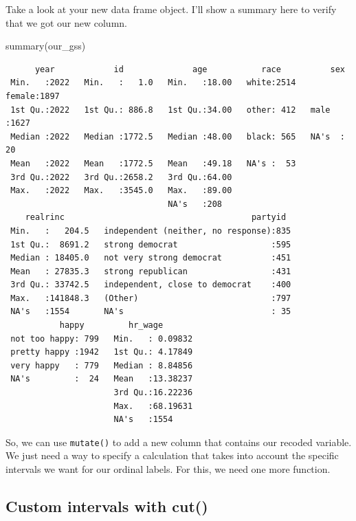 \documentclass[
  letterpaper,
  DIV=11,
  numbers=noendperiod]{scrreprt}
\newenvironment{Shaded}{\begin{snugshade}}{\end{snugshade}}
\newcommand{\FunctionTok}[1]{\textcolor[rgb]{0.28,0.35,0.67}{#1}}
\newcommand{\NormalTok}[1]{\textcolor[rgb]{0.00,0.23,0.31}{#1}}
\begin{document}
Take a look at your new data frame object. I'll show a summary here to
verify that we got our new column.

\begin{Shaded}
\begin{Highlighting}[]
\FunctionTok{summary}\NormalTok{(our\_gss)}
\end{Highlighting}
\end{Shaded}

\begin{verbatim}
      year            id              age           race          sex      
 Min.   :2022   Min.   :   1.0   Min.   :18.00   white:2514   female:1897  
 1st Qu.:2022   1st Qu.: 886.8   1st Qu.:34.00   other: 412   male  :1627  
 Median :2022   Median :1772.5   Median :48.00   black: 565   NA's  :  20  
 Mean   :2022   Mean   :1772.5   Mean   :49.18   NA's :  53                
 3rd Qu.:2022   3rd Qu.:2658.2   3rd Qu.:64.00                             
 Max.   :2022   Max.   :3545.0   Max.   :89.00                             
                                 NA's   :208                               
    realrinc                                      partyid   
 Min.   :   204.5   independent (neither, no response):835  
 1st Qu.:  8691.2   strong democrat                   :595  
 Median : 18405.0   not very strong democrat          :451  
 Mean   : 27835.3   strong republican                 :431  
 3rd Qu.: 33742.5   independent, close to democrat    :400  
 Max.   :141848.3   (Other)                           :797  
 NA's   :1554       NA's                              : 35  
           happy         hr_wage        
 not too happy: 799   Min.   : 0.09832  
 pretty happy :1942   1st Qu.: 4.17849  
 very happy   : 779   Median : 8.84856  
 NA's         :  24   Mean   :13.38237  
                      3rd Qu.:16.22236  
                      Max.   :68.19631  
                      NA's   :1554      
\end{verbatim}

So, we can use \texttt{mutate()} to add a new column that contains our
recoded variable. We just need a way to specify a calculation that takes
into account the specific intervals we want for our ordinal labels. For
this, we need one more function.

\subsection{Custom intervals with
cut()}\label{custom-intervals-with-cut}
\end{document}
